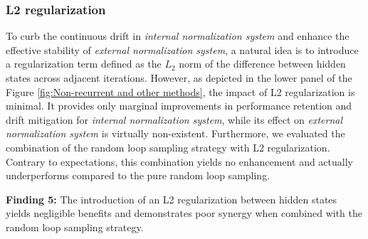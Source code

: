     \subsubsection{L2 regularization}
    To curb the continuous drift in \textit{internal normalization system} and enhance the effective stability of \textit{external normalization system}, a natural idea is to introduce a regularization term defined as the $L_2$ norm of the difference between hidden states across adjacent iterations. However, as depicted in the lower panel of the Figure \ref{fig:Non-recurrent and other methods}, the impact of L2 regularization is minimal. It provides only marginal improvements in performance retention and drift mitigation for \textit{internal normalization system}, while its effect on \textit{external normalization system} is virtually non-existent. Furthermore, we evaluated the combination of the random loop sampling strategy with L2 regularization. Contrary to expectations, this combination yields no enhancement and actually underperforms compared to the pure random loop sampling.
    \begin{findings}
    \textbf{Finding 5:} The introduction of an L2 regularization between hidden states yields negligible benefits and demonstrates poor synergy when combined with the random loop sampling strategy.
    \end{findings}




